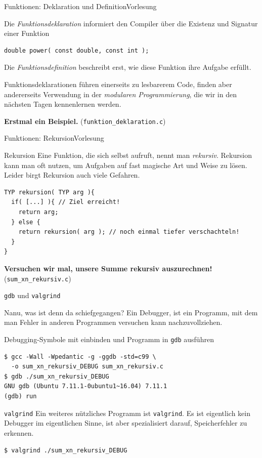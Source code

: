 \documentclass[xcolor=dvipsnames]{beamer}
\newcounter{lecturecounter}
\begin{document}
\begin{frame}[fragile]{Funktionen: Deklaration und Definition}{Vorlesung }
\begin{block}{}
  Die \emph{Funktionsdeklaration} informiert den Compiler über die Existenz und Signatur einer Funktion
\begin{lstlisting}
double power( const double, const int );
\end{lstlisting}
\end{block}
\begin{block}{}
  Die \emph{Funktionsdefinition} beschreibt erst, wie diese Funktion ihre Aufgabe erfüllt.
\end{block}
Funktionsdeklarationen führen einerseits zu lesbarerem Code, finden aber andererseits Verwendung in der \emph{modularen Programmierung}, die wir in den nächsten Tagen kennenlernen werden.

\textbf{Erstmal ein Beispiel.} (\verb|funktion_deklaration.c|)
\end{frame}

\begin{frame}[fragile]{Funktionen: Rekursion}{Vorlesung }
  \begin{block}{Rekursion}
    Eine Funktion, die sich selbst aufruft, nennt man \emph{rekursiv}. Rekursion kann man oft nutzen, um Aufgaben auf fast magische Art und Weise zu lösen. Leider birgt Rekursion auch viele Gefahren.
  \end{block}
\begin{lstlisting}
TYP rekursion( TYP arg ){
  if( [...] ){ // Ziel erreicht!
    return arg;
  } else {
    return rekursion( arg ); // noch einmal tiefer verschachteln!
  }
}
\end{lstlisting}
   \textbf{Versuchen wir mal, unsere Summe rekursiv auszurechnen!} (\verb|sum_xn_rekursiv.c|)
\end{frame}
 
\begin{frame}[fragile]{\texttt{gdb} und \texttt{valgrind}}
\begin{block}{}
  Nanu, was ist denn da schiefgegangen? Ein Debugger, ist ein Programm, mit dem man Fehler in anderen Programmen versuchen kann nachzuvollziehen.
\end{block}
\begin{block}{Debugging-Symbole mit einbinden und Programm in \texttt{gdb} ausführen}
\begin{verbatim}
$ gcc -Wall -Wpedantic -g -ggdb -std=c99 \
  -o sum_xn_rekursiv_DEBUG sum_xn_rekursiv.c
$ gdb ./sum_xn_rekursiv_DEBUG
GNU gdb (Ubuntu 7.11.1-0ubuntu1~16.04) 7.11.1
(gdb) run
\end{verbatim}
\end{block}

\begin{block}{\texttt{valgrind}}
Ein weiteres nützliches Programm ist \texttt{valgrind}. Es ist eigentlich kein Debugger im eigentlichen Sinne, ist aber spezialisiert darauf, Speicherfehler zu erkennen.
\begin{verbatim}
$ valgrind ./sum_xn_rekursiv_DEBUG
\end{verbatim}
\end{block}
\end{frame}
\end{document}
